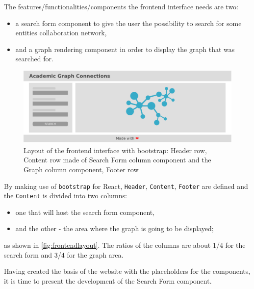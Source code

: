 The features/functionalities/components the frontend interface needs are two:
 \begin{itemize}[noitemsep]
	\item a search form component to give the user the possibility to search for some entities collaboration network,
	\item and a graph rendering component in order to display the graph that was searched for.
\end{itemize}

\begin{figure}[H]%
	\centering%
	\includegraphics[width=1\textwidth-2pt]{images/chapter4/frontendlayout.pdf}%
	\caption[Layout of the frontend interface with bootstrap]{Layout of the frontend interface with \Gls{bootstrap}: Header row, Content row made of Search Form column component and the Graph column component, Footer row}%
	\label{fig:frontendlayout}
\end{figure}%

By making use of \texttt{\Gls{bootstrap}} for React, \texttt{Header}, \texttt{Content}, \texttt{Footer} are defined and the \texttt{Content} is divided into two columns:
 \begin{itemize}[noitemsep]
	\item one that will host the search form component,
	\item and the other - the area where the graph is going to be displayed;
\end{itemize}
as shown in \hyperref[fig:frontendlayout]{\autoref{fig:frontendlayout}}.
The ratios of the columns are about 1/4 for the search form and 3/4 for the graph area.

Having created the basis of the website with the placeholders for the components, it is time to present the development of the Search Form component.

